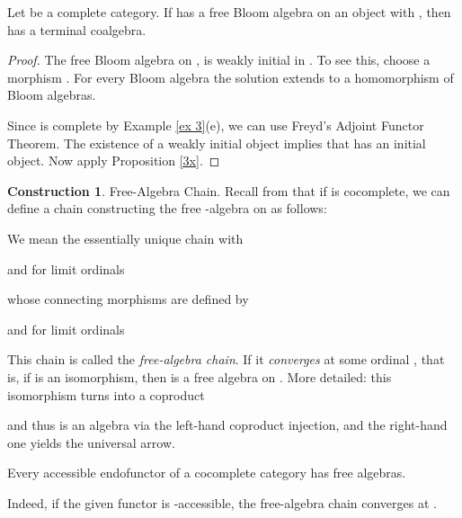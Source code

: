 \documentclass{LMCS}
\newcommand{\takeout}[1]{\empty}
\theoremstyle{plain}
\theoremstyle{definition}
\newtheorem{construction}[theorem]{Construction}
\numberwithin{equation}{section}
\begin{document}
\begin{lem}\label{free B-> final coalg}
Let  be a complete category. If  has a free Bloom algebra on an object  with , then  has a terminal coalgebra.
\end{lem}
\begin{proof}
The free Bloom algebra  on , is weakly initial in . To see this, choose a morphism . For every Bloom algebra  the solution  extends to a homomorphism  of Bloom algebras.


Since  is complete by Example \ref{ex 3}(e), we can use Freyd's Adjoint Functor Theorem.
The existence of a weakly initial object implies that  has an initial object. Now apply Proposition \ref{3x}.
\end{proof}

\takeout{
\begin{exa}\label{set functor}
Every set functor with a free Bloom algebra has a terminal coalgebra. The condition {\bf Set} is here automatically satisfied except when  is constantly .
\end{exa}
}

\begin{construction}\label{free chain} Free-Algebra Chain.
Recall from \cite{a} that if  is cocomplete, we can define a chain constructing the free -algebra on  as follows:

We mean the essentially unique chain  with

and for limit ordinals 

whose connecting morphisms  are defined by

and for limit ordinals 


This chain is called the {\it free-algebra chain}. If it \emph{converges} at some ordinal , that is, if  is an isomorphism, then  is a free algebra on . More detailed: this isomorphism turns  into a coproduct

and thus  is an algebra via the left-hand coproduct injection, and the right-hand one  yields the universal arrow.
\end{construction}

\begin{cor}\label{c-access}
Every accessible endofunctor of a cocomplete category has free algebras.
\end{cor}
Indeed, if the given functor is -accessible, the free-algebra chain converges at .
\end{document}
